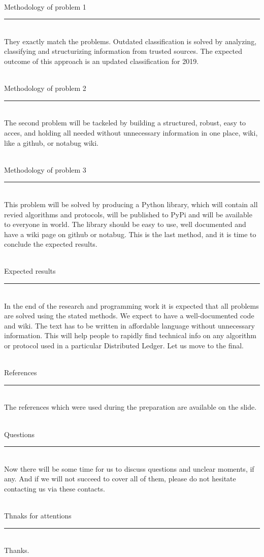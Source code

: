 \documentclass[12pt]{article}
\renewcommand{\line}[1]{\noindent\\{#1}\vspace{-0.42cm}\\\rule{\textwidth}{1pt}\\}
\begin{document}
\line{Methodology of problem 1}
They exactly match the problems. Outdated classification is solved by
analyzing, classifying and structurizing information from trusted sources. The
expected outcome of this approach is an updated classification for 2019.

\line{Methodology of problem 2}
The second problem will be tackeled by building a structured, robust, easy to
acces, and holding all needed without unnecessary information in one place,
wiki, like a github, or notabug wiki.

\line{Methodology of problem 3}
This problem will be solved by producing a Python library, which will contain
all revied algorithms and protocols, will be published to PyPi and will be
available to everyone in world. The library should be easy to use, well
documented and have a wiki page on github or notabug. This is the last method,
and it is time to conclude the expected results.

\line{Expected results}
In the end of the research and programming work it is expected that all
problems are solved using the stated methods. We expect to have a
well-documented code and wiki. The text has to be written in affordable
language without unnecessary information. This will help people to rapidly find
technical info on any algorithm or protocol used in a particular Distributed
Ledger. Let us move to the final.

\line{References}
The references which were used during the preparation are available on the
slide.

\line{Questions}
Now there will be some time for us to discuss questions and unclear moments, if
any. And if we will not succeed to cover all of them, please do not hesitate
contacting us via these contacts.

\line{Thnaks for attentions}
Thanks.
\end{document}
